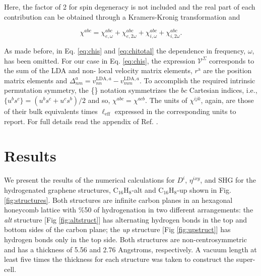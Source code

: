 \documentclass[aps,pra,11pt,tightenlines,showpacs,superscriptaddress,groupedaddress]{revtex4-1}
\newcommand{\di}{$D^{i}$}
\newcommand{\ea}{$\eta^{ixy}$}
\newcommand{\altstc}{C$_{16}$H$_{8}$-alt}
\newcommand{\upstc}{C$_{16}$H$_{8}$-up}
\begin{document}
\noindent Here, the factor of 2 for spin degeneracy is not included and the
real part of each contribution can be obtained through a Kramers-Kronig
transformation \cite{tancogne2014effect} and

\begin{equation}\label{eq:chitotal}
    \chi^{abc} = \chi^{abc}_{e,\omega} + \chi^{abc}_{e,2\omega} +
    \chi^{abc}_{i,\omega} + \chi^{abc}_{i,2\omega}
    .
\end{equation}

As made before, in Eq. \ref{eq:chis} and \ref{eq:chitotal} the dependence in
frequency, $\omega$, has been omitted. For our case in Eq. \ref{eq:chis}, the
expression $\mathcal{V}^{\Sigma}$ corresponds to the sum of the LDA and non-
local velocity matrix elements, $r^{\mathrm{a}} $ are the position matrix
elements and $\Delta^{a}_{nm} = v^{\text{LDA},a}_{nn} - v^{\text{LDA},a}_{mm}
$. To accomplish the required intrinsic permutation symmetry, the \{\} notation
symmetrizes the $bc$ Cartesian indices, i.e., $\{u^{b}s^{c}\} = (u^{b}s^{c} +
u^{c}s^{b})/{2}$ and so, $\chi^{abc} = \chi^{acb}$. The units of $\chi^{ijk} $,
again, are those of their bulk equivalents times $\ell_{\text{eff}}$ expressed
in the corresponding units to report. For full details read the appendix of
Ref. \cite{anderson2015theory}.







\section{Results} %
\label{sec:results}

We present the results of the numerical calculations for \di, \ea, and SHG for
the hydrogenated graphene structures, {\altstc} and {\upstc} shown in Fig.
\ref{fig:structures}. Both structures are infinite carbon planes in an
hexagonal honeycomb lattice with \%50 of hydrogenation in two different
arrangements: the \emph{alt} structure [Fig \ref{fig:altstruct}] has
alternating hydrogen bonds in the top and bottom sides of the carbon plane; the
\emph{up} structure [Fig \ref{fig:upstruct}] has hydrogen bonds only in the top
side. Both structures are non-centrosymmetric and has a thickness of 5.56 and
2.76 Angstroms, respectively. A vacuum length at least  five times the
thickness for each structure was taken to construct the super-cell.
\end{document}
